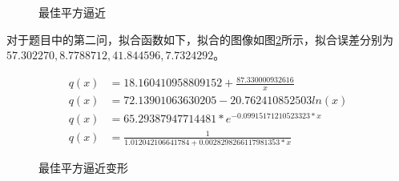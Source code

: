 \begin{figure}[htbp]
    \centering

    \centering
    \caption{最佳平方逼近}
    \label{fig:lsa}
\end{figure}


对于题目中的第二问，拟合函数如下，拟合的图像如图\ref{fig:lsa2}所示，拟合误差分别为 $57.302270,8.7788712,41.844596,7.7324292$。

\begin{align}
    q(x) &= 18.160410958809152 + \frac{87.330000932616}{x}  \\
    q(x) &= 72.13901063630205 -20.762410852503 ln(x)  \\
    q(x) &= 65.29387947714481 * e^{-0.09915171210523323 * x} \\
    q(x) &= \frac{1}{ 1.012042106641784 + 0.0028298266117981353 * x}
\end{align}

\begin{figure}[htbp]
    \centering

    \centering
    \caption{最佳平方逼近变形}
    \label{fig:lsa2}
\end{figure}

